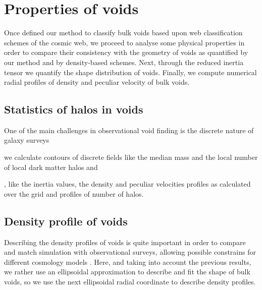 \documentclass[a4,useAMS,usenatbib,usegraphicx]{latex/mn2e}
\begin{document}
\section{Properties of voids}
\label{sec:properties}


Once defined our method to classify bulk voids based upon web 
classification schemes of the cosmic web, we proceed to analyse some 
physical properties in order to compare their consistency with the 
geometry of voids as quantified by our method and by density-based schemes.
Next, through the reduced inertia tensor we quantify the shape distribution 
of voids. Finally, we compute numerical radial profiles of density and 
peculiar velocity of bulk voids.


\subsection{Statistics of halos in voids}
\label{subsec:shape_voids}


One of the main challenges in observational void finding is the discrete 
nature of galaxy surveys

 we calculate contours of discrete fields like the median mass and 
the local number of local dark matter halos and

, like the inertia values,
the density and peculiar velocities profiles as calculated over the grid 
and profiles of number of halos.


\subsection{Density profile of voids}
\label{subsec:density_voids}


Describing the density profiles of voids is quite important in order to 
compare and match simulation with observational surveys, allowing possible
constrains for different cosmology models \SRKED{[Hamaous, et.al 2014]}. 
Here, and taking into account the previous results, we rather use an 
ellipsoidal approximation to describe and fit the shape of bulk voids, so 
we use the next ellipsoidal radial coordinate to describe density profiles.
\end{document}
